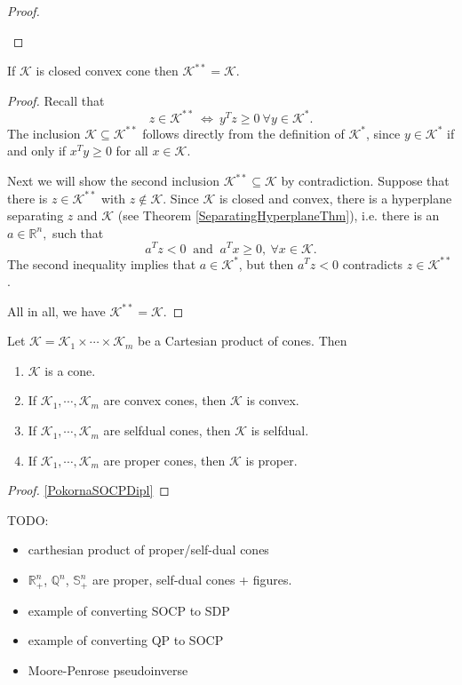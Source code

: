 \documentclass[12pt]{book}
\theoremstyle{definition}
\begin{document}
\begin{appendix}
\begin{proof}
\begin{enumerate}
\end{enumerate}
\end{proof}

\prop If $\mathcal{K}$ is closed convex cone then $\mathcal{K}^{**} = \mathcal{K}$.

\begin{proof}
Recall that 
$$ z \in \mathcal{K}^{**} \ \Leftrightarrow \  y^Tz \geq 0 \ \forall y\in \mathcal{K}^{*}.$$
The inclusion $\mathcal{K} \subseteq \mathcal{K}^{**}$ follows directly from the definition of $\mathcal{K}^{*}$, since $y\in\mathcal{K}^{*}$ if and only if $x^Ty\geq 0$ for all $x\in \mathcal{K}$. 

Next we will show the second inclusion  $\mathcal{K}^{**} \subseteq \mathcal{K}$ by contradiction.
Suppose that there is $z \in \mathcal{K}^{**}$ with $z \notin \mathcal{K}$.
Since $\mathcal{K}$ is closed and convex, there is a hyperplane separating $z$ and $\mathcal{K}$ (see Theorem \ref{SeparatingHyperplaneThm}), i.e. there is an $a \in \mathbb{R}^n, $ such that 
$$ a^Tz <0  \ \mbox{ and } \ a^Tx\geq 0, \ \forall x\in\mathcal{K}.$$
The second inequality implies that $a\in \mathcal{K}^*$, but then  $ a^Tz <0 $ contradicts $z\in \mathcal{K}^{**}$.

All in all,  we have $\mathcal{K}^{**} = \mathcal{K}$.
\end{proof}




\prop[{[\ref{PokornaSOCPDipl}]}] 
\label{ConesCartesianProduct}
Let $\mathcal{K} = \mathcal{K}_1 \times \cdots \times \mathcal{K}_m $ be a Cartesian product of cones. Then
\begin{enumerate}
\item $\mathcal{K}$ is a cone.
\item If $\mathcal{K}_1, \cdots ,\mathcal{K}_m $ are convex cones, then $\mathcal{K}$ is convex.
\item If $\mathcal{K}_1, \cdots ,\mathcal{K}_m $ are selfdual cones, then $\mathcal{K}$ is selfdual.
\item If $\mathcal{K}_1, \cdots ,\mathcal{K}_m $ are proper cones, then $\mathcal{K}$ is proper.
\end{enumerate} 
\begin{proof}
\ref{PokornaSOCPDipl}
\end{proof}





TODO: 
\begin{itemize}
\item carthesian product of proper/self-dual cones
\item $\mathbb{R}^n_+$, $\mathbb{Q}^n$, $ \mathbb{S}^n_+$ are proper, self-dual cones + figures.
\item example of converting SOCP to SDP
\item example of converting QP to SOCP
\item Moore-Penrose pseudoinverse


\end{itemize}
\end{appendix}
\end{document}
